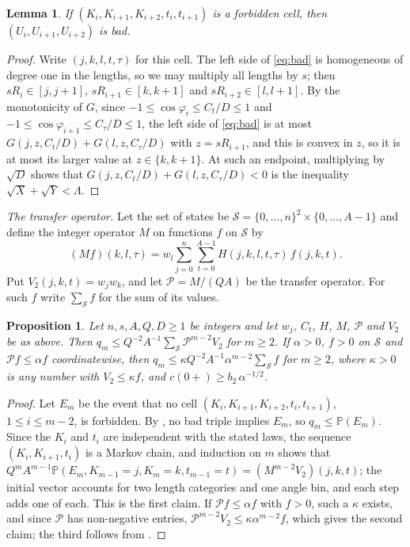 \documentclass[11pt]{article}
\newtheorem{lemma}[theorem]{Lemma}
\newtheorem{proposition}[theorem]{Proposition}
\theoremstyle{remark}
\newcommand{\Prob}{\mathbb{P}}
\begin{document}
\begin{lemma}\label{lem:cell}
If $(K_i,K_{i+1},K_{i+2},t_i,t_{i+1})$ is a forbidden cell, then $(U_i,U_{i+1},U_{i+2})$ is bad.
\end{lemma}

\begin{proof}
Write $(j,k,l,t,\tau)$ for this cell. The left side of \eqref{eq:bad} is homogeneous of degree one in the lengths, so we may multiply all lengths by $s$; then $sR_i\in[j,j+1]$,
$sR_{i+1}\in[k,k+1]$ and $sR_{i+2}\in[l,l+1]$. By the monotonicity of $G$, since $-1\le\cos\varphi_i\le C_t/D\le 1$ and $-1\le\cos\varphi_{i+1}\le C_\tau/D\le 1$, the left side of \eqref{eq:bad} is at most
$G(j,z,C_t/D)+G(l,z,C_\tau/D)$ with $z=sR_{i+1}$, and this is convex in $z$, so it is at most its larger value at
$z\in\{k,k+1\}$. At such an endpoint, multiplying by $\sqrt D$ shows that $G(j,z,C_t/D)+G(l,z,C_\tau/D)<0$ is the
inequality $\sqrt X+\sqrt Y<\Lambda$.
\end{proof}

\emph{The transfer operator.} Let the set of states be $\mathcal S=\{0,\dots,n\}^2\times\{0,\dots,A-1\}$ and define the integer operator $M$ on functions $f$ on
$\mathcal S$ by
\[
(Mf)(k,l,\tau)=w_l\sum_{j=0}^{n}\sum_{t=0}^{A-1}H(j,k,l,t,\tau)\,f(j,k,t).
\]
Put $V_2(j,k,t)=w_jw_k$, and let $\mathcal P=M/(QA)$ be the transfer operator. For such $f$ write
$\sum_{\mathcal S}f$ for the sum of its values.

\begin{proposition}\label{prop:transfer}
Let $n,s,A,Q,D\ge 1$ be integers and let $w_j$, $C_t$, $H$, $M$, $\mathcal P$ and $V_2$ be as above. Then $q_m\le Q^{-2}A^{-1}\sum_{\mathcal S}\mathcal P^{m-2}V_2$ for $m\ge 2$. If $\alpha>0$, $f>0$
on $\mathcal S$ and $\mathcal Pf\le\alpha f$ coordinatewise, then $q_m\le\kappa Q^{-2}A^{-1}\alpha^{m-2}\sum_{\mathcal S}f$ for
$m\ge2$, where $\kappa>0$ is any number with $V_2\le\kappa f$, and $c(0+)\ge b_2\,\alpha^{-1/2}$.
\end{proposition}

\begin{proof}
Let $E_m$ be the event that no cell $(K_i,K_{i+1},K_{i+2},t_i,t_{i+1})$, $1\le i\le m-2$, is forbidden. By
, no bad triple implies $E_m$, so $q_m\le\Prob(E_m)$. Since the $K_i$ and $t_i$ are independent with
the stated laws, the sequence $(K_i,K_{i+1},t_i)$ is a Markov chain, and induction on $m$ shows that $Q^mA^{m-1}
\Prob(E_m,K_{m-1}=j,K_m=k,t_{m-1}=t)=(M^{m-2}V_2)(j,k,t)$; the initial vector accounts for two length categories and
one angle bin, and each step adds one of each. This is the first claim. If $\mathcal Pf\le\alpha f$ with $f>0$, such a $\kappa$
exists, and since $\mathcal P$ has non-negative entries, $\mathcal P^{m-2}V_2\le \kappa\alpha^{m-2}f$, which gives the second claim;
the third follows from .
\end{proof}
\end{document}
